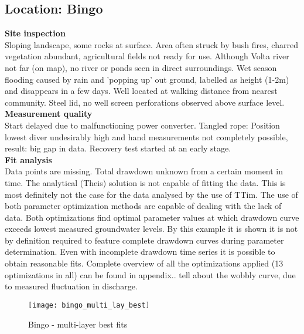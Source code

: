 \subsection{Location: Bingo}

\textbf{Site inspection}\\
Sloping landscape, some rocks at surface. Area often struck by bush fires, charred vegetation abundant, agricultural fields not ready for use. Although Volta river not far (on map), no river or ponds seen in direct surroundings. Wet season flooding caused by rain and ’popping up’ out ground, labelled as height (1-2m) and disappears in a few days. Well located at walking distance from nearest community. Steel lid, no well screen perforations observed above surface level. \\

\textbf{Measurement quality}\\
Start delayed due to malfunctioning power converter. Tangled rope: Position lowest diver undesirably high and hand measurements not completely possible, result: big gap in data. Recovery test started at an early stage. \\

\textbf{Fit analysis} \\
Data points are missing. Total drawdown unknown from a certain moment in time. The analytical (Theis) solution is not capable of fitting the data. This is most definitely not the case for the data analysed by the use of TTim. The use of both parameter optimization methods are capable of dealing with the lack of data. Both optimizations find optimal parameter values at which drawdown curve exceeds lowest measured groundwater levels. By this example it is shown it is not by definition required to feature complete drawdown curves during parameter determination. Even with incomplete drawdown time series it is possible to obtain reasonable fits. Complete overview of all the optimizations applied (13 optimizations in all) can be found in appendix.. tell about the wobbly curve, due to measured fluctuation in discharge. \\

\begin{figure}[h!]
 \centering
 \texttt{[image: bingo\_multi\_lay\_best]}
 \captionsetup{justification=centering} 
 \caption{Bingo - multi-layer best fits}
 \label{fig:Bingo_best}
\end{figure}

